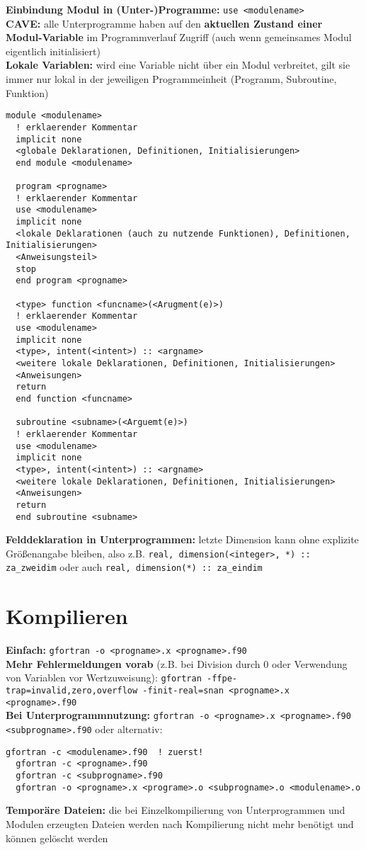 \documentclass[a4paper, twocolumn]{scrarticle}
\begin{document}
\textbf{Einbindung Modul in (Unter-)Programme:} \lstinline|use <modulename>|\\
\textbf{CAVE:} alle Unterprogramme haben auf den \textbf{aktuellen Zustand einer Modul-Variable} im Programmverlauf Zugriff (auch wenn gemeinsames Modul eigentlich initialisiert)\\
\textbf{Lokale Variablen:} wird eine Variable nicht über ein Modul \glqq verbreitet\grqq, gilt sie immer nur lokal in der jeweiligen Programmeinheit (Programm, Subroutine, Funktion)
\begin{lstlisting}[caption={\bfseries Dateischema Modul, Haupt- und Unterprogramme }]
  module <modulename>
  ! erklaerender Kommentar
  implicit none
  <globale Deklarationen, Definitionen, Initialisierungen>
  end module <modulename>
  
  program <progname>
  ! erklaerender Kommentar
  use <modulename>
  implicit none
  <lokale Deklarationen (auch zu nutzende Funktionen), Definitionen, Initialisierungen>
  <Anweisungsteil>
  stop
  end program <progname>
  
  <type> function <funcname>(<Arugment(e)>)
  ! erklaerender Kommentar
  use <modulename>
  implicit none
  <type>, intent(<intent>) :: <argname>
  <weitere lokale Deklarationen, Definitionen, Initialisierungen>
  <Anweisungen>
  return
  end function <funcname>
  
  subroutine <subname>(<Arguemt(e)>)
  ! erklaerender Kommentar
  use <modulename>
  implicit none
  <type>, intent(<intent>) :: <argname>
  <weitere lokale Deklarationen, Definitionen, Initialisierungen>
  <Anweisungen>
  return
  end subroutine <subname>
\end{lstlisting}
\textbf{Felddeklaration in Unterprogrammen:} letzte Dimension kann ohne explizite Größenangabe bleiben, also z.B. \lstinline|real, dimension(<integer>, *) :: za_zweidim| oder auch \lstinline|real, dimension(*) :: za_eindim|

\section{Kompilieren}
\textbf{Einfach:} \lstinline[style=neutral]|gfortran -o <progname>.x <progname>.f90| \\
\textbf{Mehr Fehlermeldungen vorab} (z.B. bei Division durch 0 oder Verwendung von Variablen vor Wertzuweisung): \lstinline[style=neutral]|gfortran -ffpe-trap=invalid,zero,overflow -finit-real=snan <progname>.x <progname>.f90|\\
\textbf{Bei Unterprogrammnutzung:} \lstinline[style=neutral]|gfortran -o <progname>.x <progname>.f90 <subprogname>.f90| oder alternativ:
\begin{lstlisting}[style=neutral,caption={\textbf{Kompilieren von Haupt- und Unterprogrammenn}}]
  gfortran -c <modulename>.f90  ! zuerst!
  gfortran -c <progname>.f90 
  gfortran -c <subprogname>.f90 
  gfortran -o <progname>.x <programe>.o <subprogname>.o <modulename>.o
\end{lstlisting}
\textbf{Temporäre Dateien:} die bei Einzelkompilierung von Unterprogrammen und Modulen erzeugten Dateien werden nach Kompilierung nicht mehr benötigt und können gelöscht werden
\end{document}
